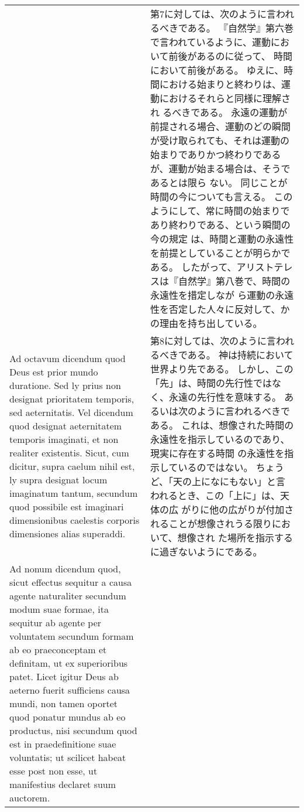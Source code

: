 \documentclass[10pt]{jsarticle} %
\begin{document}
\begin{longtable}{p{21em}p{21em}}
&

第7に対しては、次のように言われるべきである。
『自然学』第六巻で言われているように、運動において前後があるのに従って、
 時間において前後がある。
ゆえに、時間における始まりと終わりは、運動におけるそれらと同様に理解され
 るべきである。
永遠の運動が前提される場合、運動のどの瞬間が受け取られても、それは運動の
 始まりでありかつ終わりであるが、運動が始まる場合は、そうであるとは限ら
 ない。
同じことが時間の今についても言える。
このようにして、常に時間の始まりであり終わりである、という瞬間の今の規定
 は、時間と運動の永遠性を前提としていることが明らかである。
したがって、アリストテレスは『自然学』第八巻で、時間の永遠性を措定しなが
 ら運動の永遠性を否定した人々に反対して、かの理由を持ち出している。

\\



{\sc Ad octavum dicendum} quod Deus est prior mundo duratione. Sed ly prius
 non designat prioritatem temporis, sed aeternitatis. Vel dicendum quod
 designat aeternitatem temporis imaginati, et non realiter
 existentis. Sicut, cum dicitur, supra caelum nihil est, ly supra
 designat locum imaginatum tantum, secundum quod possibile est imaginari
 dimensionibus caelestis corporis dimensiones alias superaddi.

&


第8に対しては、次のように言われるべきである。
神は持続において世界より先である。
しかし、この「先」は、時間の先行性ではなく、永遠の先行性を意味する。
あるいは次のように言われるべきである。
これは、想像された時間の永遠性を指示しているのであり、現実に存在する時間
 の永遠性を指示しているのではない。
ちょうど、「天の上になにもない」と言われるとき、この「上に」は、天体の広
 がりに他の広がりが付加されることが想像されうる限りにおいて、想像され
 た場所を指示するに過ぎないようにである。


\\



{\sc Ad nonum dicendum} quod, sicut effectus sequitur a causa agente
 naturaliter secundum modum suae formae, ita sequitur ab agente per
 voluntatem secundum formam ab eo praeconceptam et definitam, ut ex
 superioribus patet. Licet igitur Deus ab aeterno fuerit sufficiens
 causa mundi, non tamen oportet quod ponatur mundus ab eo productus,
 nisi secundum quod est in praedefinitione suae voluntatis; ut scilicet
 habeat esse post non esse, ut manifestius declaret suum auctorem.

&


\end{longtable}
\end{document}
